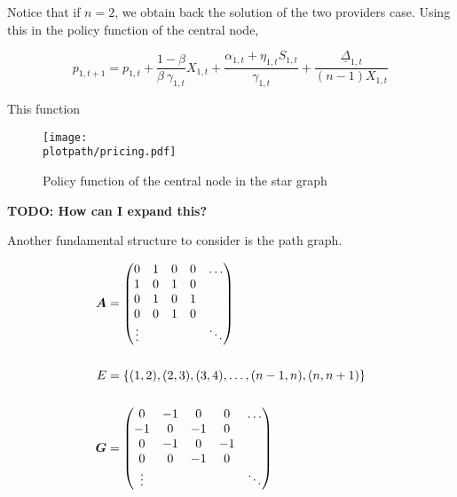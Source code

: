 Notice that if $n = 2$, we obtain back the solution of the two providers case. Using this in the policy function of the central node,

\begin{equation*}
  p_{1, t+1} = p_{1, t} + \frac{1-\beta}{\beta \ \gamma_{1, t}} X_{1, t} + \frac{\alpha_{1, t} + \eta_{1, t} S_{1, t}}{\gamma_{1, t}} + \frac{\underline{\Delta}_{1, t}}{(n-1) X_{1, t}}
\end{equation*}

This function

\begin{figure}[H]
  \centering
  \texttt{[image: \\plotpath/pricing.pdf]}
  \caption{Policy function of the central node in the star graph}
  \label{fig:p}
\end{figure}

\textbf{TODO: How can I expand this?}

Another fundamental structure to consider is the path graph.

\vspace{5mm}
\begin{minipage}{.5\textwidth}
  \resizebox{\textwidth}{!}{}
\end{minipage}
\begin{minipage}{.5\textwidth}
  \begin{equation*}
    \begin{split}
      \matr{A} &= \begin{pmatrix}
        0      & 1 & 0 & 0 & \ldots \\
        1      & 0 & 1 & 0 &        \\
        0      & 1 & 0 & 1 &        \\
        0      & 0 & 1 & 0 &        \\
        \vdots &   &   &   & \ddots
      \end{pmatrix} \\
      \vspace{5mm} \\
      E &= \set{(1, 2), (2, 3), (3, 4), \ldots, (n-1, n), (n, n+1)} \\
      \vspace{5mm} \\
      \G &= \begin{pmatrix}
        0      & -1 & 0  & 0  & \ldots \\
        -1     & 0  & -1 & 0  &        \\
        0      & -1 & 0  & -1 &        \\
        0      & 0  & -1 & 0  &        \\
        \vdots &    &    &    & \ddots
      \end{pmatrix}
    \end{split}
  \end{equation*}
\end{minipage}
\vspace{5mm}

